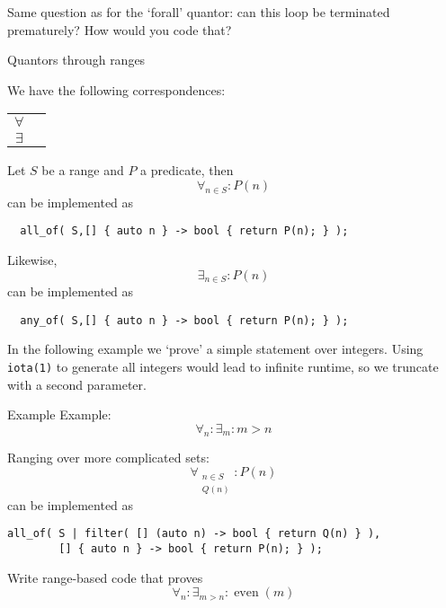 \begin{exercise}
  Same question as for the `forall' quantor:
  can this loop be terminated prematurely?
  How would you code that?
\end{exercise}

 {Quantors through ranges}

We have the following correspondences:

  \begin{tabular}{cc}
    $\forall$&\n{all_of}\\ 
    $\exists$&\n{any_of}
  \end{tabular}

Let $S$ be a range and $P$ a predicate, then
\[ \forall_{n\in S}\colon P(n) \]
can be implemented as
\begin{lstlisting}
  all_of( S,[] { auto n } -> bool { return P(n); } );
\end{lstlisting}
Likewise,
\[ \exists_{n\in S}\colon P(n) \]
can be implemented as
\begin{lstlisting}
  any_of( S,[] { auto n } -> bool { return P(n); } );
\end{lstlisting}

In the following example we `prove' a simple statement over integers.
Using \lstinline+iota(1)+ to generate all integers
would lead to infinite runtime, so we truncate with a second parameter.

\begin{block}{Example}
  \label{sl:forall-n-greater}
  Example: \[ \forall_n\colon\exists_m\colon m>n \]
\end{block}

Ranging over more complicated sets:
\[ \forall_{\scriptstyle \begin{array}{cc}n\in S \\ Q(n)\end{array}}\colon P(n) \]
can be implemented as
\begin{lstlisting}
all_of( S | filter( [] (auto n) -> bool { return Q(n) } ),
        [] { auto n } -> bool { return P(n); } );
\end{lstlisting}

\begin{exercise}
  \label{ex:forall-n-greater-even}
  Write range-based code that proves
  \[ \forall_n\colon \exists_{m>n}\colon \mathop{\mathrm{even}}(m) \]
\end{exercise}



